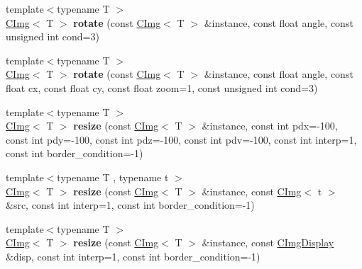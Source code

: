 \begin{DoxyCompactItemize}
\item 
\hypertarget{namespacecimg__library_af9bf65ab06672c9367e2d7fc52446899}{{\footnotesize template$<$typename T $>$ }\\\hyperlink{structcimg__library_1_1_c_img}{C\-Img}$<$ T $>$ {\bfseries rotate} (const \hyperlink{structcimg__library_1_1_c_img}{C\-Img}$<$ T $>$ \&instance, const float angle, const unsigned int cond=3)}\label{namespacecimg__library_af9bf65ab06672c9367e2d7fc52446899}

\item 
\hypertarget{namespacecimg__library_a8a6701983bacc473806a14df72e37fee}{{\footnotesize template$<$typename T $>$ }\\\hyperlink{structcimg__library_1_1_c_img}{C\-Img}$<$ T $>$ {\bfseries rotate} (const \hyperlink{structcimg__library_1_1_c_img}{C\-Img}$<$ T $>$ \&instance, const float angle, const float cx, const float cy, const float zoom=1, const unsigned int cond=3)}\label{namespacecimg__library_a8a6701983bacc473806a14df72e37fee}

\item 
\hypertarget{namespacecimg__library_a8d3dd3cb2a544e135083805d8ab9f68c}{{\footnotesize template$<$typename T $>$ }\\\hyperlink{structcimg__library_1_1_c_img}{C\-Img}$<$ T $>$ {\bfseries resize} (const \hyperlink{structcimg__library_1_1_c_img}{C\-Img}$<$ T $>$ \&instance, const int pdx=-\/100, const int pdy=-\/100, const int pdz=-\/100, const int pdv=-\/100, const int interp=1, const int border\-\_\-condition=-\/1)}\label{namespacecimg__library_a8d3dd3cb2a544e135083805d8ab9f68c}

\item 
\hypertarget{namespacecimg__library_a1cdbde2da1268e82b02f4570d44541cf}{{\footnotesize template$<$typename T , typename t $>$ }\\\hyperlink{structcimg__library_1_1_c_img}{C\-Img}$<$ T $>$ {\bfseries resize} (const \hyperlink{structcimg__library_1_1_c_img}{C\-Img}$<$ T $>$ \&instance, const \hyperlink{structcimg__library_1_1_c_img}{C\-Img}$<$ t $>$ \&src, const int interp=1, const int border\-\_\-condition=-\/1)}\label{namespacecimg__library_a1cdbde2da1268e82b02f4570d44541cf}

\item 
\hypertarget{namespacecimg__library_a1f727610d87ba50e048aff0dc35ee8b7}{{\footnotesize template$<$typename T $>$ }\\\hyperlink{structcimg__library_1_1_c_img}{C\-Img}$<$ T $>$ {\bfseries resize} (const \hyperlink{structcimg__library_1_1_c_img}{C\-Img}$<$ T $>$ \&instance, const \hyperlink{structcimg__library_1_1_c_img_display}{C\-Img\-Display} \&disp, const int interp=1, const int border\-\_\-condition=-\/1)}\label{namespacecimg__library_a1f727610d87ba50e048aff0dc35ee8b7}


\end{DoxyCompactItemize}
